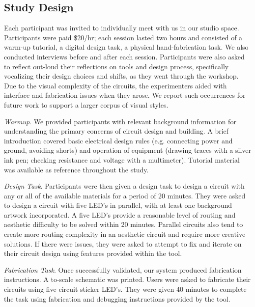 \documentclass{sigchi}
\begin{document}
\subsection{Study Design}

    Each participant was invited to individually meet with us in our studio space. Participants were paid \$20/hr; each session lasted two hours and consisted of a warm-up tutorial, a digital design task, a physical hand-fabrication task. We also conducted interviews before and after each session. Participants were also asked to reflect out-loud their reflections on tools and design process, specifically vocalizing their design choices and shifts, as they went through the workshop. Due to the visual complexity of the circuits, the experimenters aided with interface and fabrication issues when they arose. We report such occurrences for future work to support a larger corpus of visual styles. 

    \textit{Warmup}. We provided participants with relevant background information for understanding the primary concerns of circuit design and building. A brief introduction covered basic electrical design rules (e.g. connecting power and ground, avoiding shorts) and operation of equipment (drawing traces with a silver ink pen; checking resistance and voltage with a multimeter). Tutorial material was available as reference throughout the study. 

    \textit{Design Task}. Participants were then given a design task to design a circuit with any or all of the available materials for a period of 20 minutes. They were asked to design a circuit with five LED's in parallel, with at least one background artwork incorporated. A five LED's provide a reasonable level of routing and aesthetic difficulty to be solved within 20 minutes. Parallel circuits also tend to create more routing complexity in an aesthetic circuit and require more creative solutions. If there were issues, they were asked to attempt to fix and iterate on their circuit design using features provided within the tool. 

    \textit{Fabrication Task}. Once successfully validated, our system produced fabrication instructions. A to-scale schematic was printed. Users were asked to fabricate their circuits using five circuit sticker LED's. They were given 40 minutes to complete the task using fabrication and debugging instructions provided by the tool.  
\end{document}
